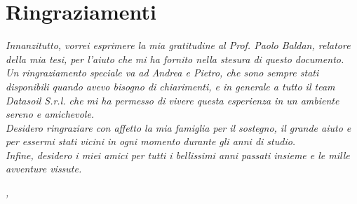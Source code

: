 
\cleardoublepage
{}
{}

\bigskip

\begingroup
\let\clearpage\relax
\let\cleardoublepage\relax
\let\cleardoublepage\relax

\chapter*{Ringraziamenti}

\noindent \textit{Innanzitutto, vorrei esprimere la mia gratitudine al Prof. Paolo Baldan, relatore della mia tesi, per l'aiuto che mi ha fornito nella stesura di questo documento.}\\

\noindent \textit{Un ringraziamento speciale va ad Andrea e Pietro, che sono sempre stati disponibili quando avevo bisogno di chiarimenti, e in generale a tutto il team Datasoil S.r.l. che mi ha permesso di vivere questa esperienza in un ambiente sereno e amichevole.}\\

\noindent \textit{Desidero ringraziare con affetto la mia famiglia per il sostegno, il grande aiuto e per essermi stati vicini in ogni momento durante gli anni di studio.}\\

\noindent \textit{Infine, desidero i miei amici per tutti i bellissimi anni passati insieme e le mille avventure vissute.}\\
\bigskip

\noindent\textit{\myLocation, \myTime}
\hfill \myName

\endgroup

